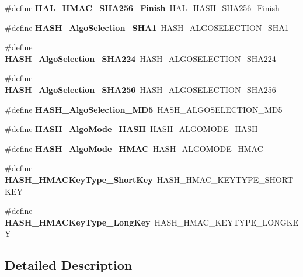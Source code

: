 \begin{DoxyCompactItemize}
\#define {\bfseries H\+A\+L\+\_\+\+H\+M\+A\+C\+\_\+\+S\+H\+A256\+\_\+\+Finish}~H\+A\+L\+\_\+\+H\+A\+S\+H\+\_\+\+S\+H\+A256\+\_\+\+Finish
\item 
\mbox{\label{group___h_a_l___h_a_s_h___aliased___functions_gaa866d6ac9e86d2290b012681836f22d0}} 
\#define {\bfseries H\+A\+S\+H\+\_\+\+Algo\+Selection\+\_\+\+S\+H\+A1}~H\+A\+S\+H\+\_\+\+A\+L\+G\+O\+S\+E\+L\+E\+C\+T\+I\+O\+N\+\_\+\+S\+H\+A1
\item 
\mbox{\label{group___h_a_l___h_a_s_h___aliased___functions_gaf8b9faddbf24e087ec70742275a16e97}} 
\#define {\bfseries H\+A\+S\+H\+\_\+\+Algo\+Selection\+\_\+\+S\+H\+A224}~H\+A\+S\+H\+\_\+\+A\+L\+G\+O\+S\+E\+L\+E\+C\+T\+I\+O\+N\+\_\+\+S\+H\+A224
\item 
\mbox{\label{group___h_a_l___h_a_s_h___aliased___functions_ga4dd93835c16dcffba7e303a2412d58ad}} 
\#define {\bfseries H\+A\+S\+H\+\_\+\+Algo\+Selection\+\_\+\+S\+H\+A256}~H\+A\+S\+H\+\_\+\+A\+L\+G\+O\+S\+E\+L\+E\+C\+T\+I\+O\+N\+\_\+\+S\+H\+A256
\item 
\mbox{\label{group___h_a_l___h_a_s_h___aliased___functions_gac443db7ebfff6d660b9321c59ecf48ed}} 
\#define {\bfseries H\+A\+S\+H\+\_\+\+Algo\+Selection\+\_\+\+M\+D5}~H\+A\+S\+H\+\_\+\+A\+L\+G\+O\+S\+E\+L\+E\+C\+T\+I\+O\+N\+\_\+\+M\+D5
\item 
\mbox{\label{group___h_a_l___h_a_s_h___aliased___functions_ga4de18ef48bad8fe403226abe769bd921}} 
\#define {\bfseries H\+A\+S\+H\+\_\+\+Algo\+Mode\+\_\+\+H\+A\+SH}~H\+A\+S\+H\+\_\+\+A\+L\+G\+O\+M\+O\+D\+E\+\_\+\+H\+A\+SH
\item 
\mbox{\label{group___h_a_l___h_a_s_h___aliased___functions_ga70224c1ea0eef2f45363f92fc001a875}} 
\#define {\bfseries H\+A\+S\+H\+\_\+\+Algo\+Mode\+\_\+\+H\+M\+AC}~H\+A\+S\+H\+\_\+\+A\+L\+G\+O\+M\+O\+D\+E\+\_\+\+H\+M\+AC
\item 
\mbox{\label{group___h_a_l___h_a_s_h___aliased___functions_ga75d858a8b5b891edc321486eebe74692}} 
\#define {\bfseries H\+A\+S\+H\+\_\+\+H\+M\+A\+C\+Key\+Type\+\_\+\+Short\+Key}~H\+A\+S\+H\+\_\+\+H\+M\+A\+C\+\_\+\+K\+E\+Y\+T\+Y\+P\+E\+\_\+\+S\+H\+O\+R\+T\+K\+EY
\item 
\mbox{\label{group___h_a_l___h_a_s_h___aliased___functions_ga99296878d9ed1d3ede590fdeef8f8394}} 
\#define {\bfseries H\+A\+S\+H\+\_\+\+H\+M\+A\+C\+Key\+Type\+\_\+\+Long\+Key}~H\+A\+S\+H\+\_\+\+H\+M\+A\+C\+\_\+\+K\+E\+Y\+T\+Y\+P\+E\+\_\+\+L\+O\+N\+G\+K\+EY
\end{DoxyCompactItemize}


\subsection{Detailed Description}
